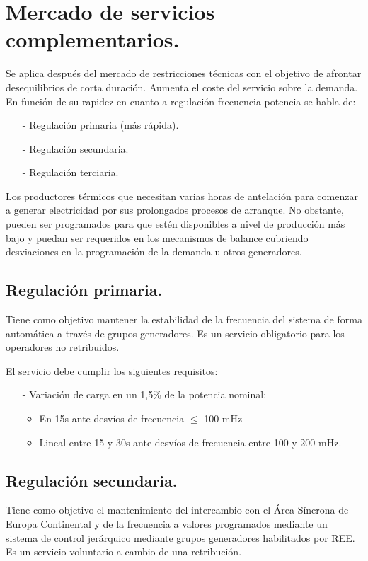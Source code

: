 \section{Mercado de servicios complementarios.} 
Se aplica después del mercado de restricciones técnicas con el objetivo de afrontar desequilibrios de corta duración. Aumenta el coste del servicio sobre la demanda. En función de su rapidez en cuanto a regulación frecuencia-potencia se habla de:
\begin{itemize}
	\item [-] Regulación primaria (más rápida).
	\item [-] Regulación secundaria.
	\item [-] Regulación terciaria.
\end{itemize}
Los productores térmicos que necesitan varias horas de antelación para comenzar a generar
electricidad por sus prolongados procesos de arranque. No obstante, pueden ser programados para que estén
disponibles a nivel de producción más bajo y puedan ser requeridos en los mecanismos de balance cubriendo desviaciones en la programación
de la demanda u otros generadores.
\newpage
\subsection{Regulación primaria.}
Tiene como objetivo mantener la estabilidad de la frecuencia del sistema de forma automática a través de grupos generadores. Es un servicio obligatorio para los operadores no retribuidos.

El servicio debe cumplir los siguientes requisitos:
\begin{itemize}
	\item [-] Variación de carga en un 1,5\% de la potencia nominal:
	\begin{itemize}
		\item En 15s ante desvíos de frecuencia $\le$ 100 mHz
		\item Lineal entre 15 y 30s ante desvíos de frecuencia entre 100 y 200 mHz.
	\end{itemize}
\end{itemize}
\subsection{Regulación secundaria.}
Tiene como objetivo el mantenimiento del intercambio con el Área Síncrona de Europa Continental y de la frecuencia a valores programados mediante un sistema de control jerárquico mediante grupos generadores habilitados por REE. Es un servicio voluntario a cambio de una retribución.


